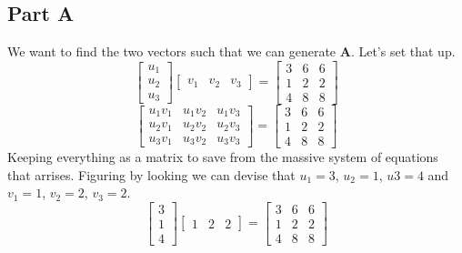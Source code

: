 \documentclass{article}
\begin{document}
        \subsection{Part A}
            We want to find the two vectors such that we can generate $\mathbf{A}$. Let's set that up.
            \[
                \begin{bmatrix}u_1\\u_2\\u_3\end{bmatrix}
                \begin{bmatrix}v_1&v_2&v_3\end{bmatrix}
                =
                \begin{bmatrix}3&6&6\\1&2&2\\4&8&8\end{bmatrix}
            \]
            \[
                \begin{bmatrix}u_1v_1&u_1v_2&u_1v_3\\u_2v_1&u_2v_2&u_2v_3\\u_3v_1&u_3v_2&u_3v_3\end{bmatrix}
                =
                \begin{bmatrix}3&6&6\\1&2&2\\4&8&8\end{bmatrix}
            \]
            Keeping everything as a matrix to save from the massive system of equations that arrises.
            Figuring by looking we can devise that $u_1=3$, $u_2=1$, $u3=4$ and $v_1=1$, $v_2=2$, $v_3=2$.
            \[
                \begin{bmatrix}3\\1\\4\end{bmatrix}
                \begin{bmatrix}1&2&2\end{bmatrix}
                =
                \begin{bmatrix}3&6&6\\1&2&2\\4&8&8\end{bmatrix}
            \]
\end{document}
